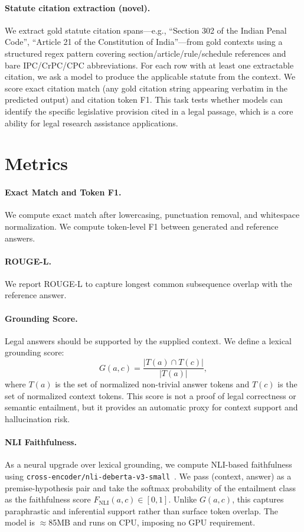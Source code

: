 \documentclass{article}
\begin{document}
\paragraph{Statute citation extraction (novel).}
We extract gold statute citation spans---e.g., ``Section 302 of the Indian Penal Code'', ``Article 21 of the Constitution of India''---from gold contexts using a structured regex pattern covering section/article/rule/schedule references and bare IPC/CrPC/CPC abbreviations. For each row with at least one extractable citation, we ask a model to produce the applicable statute from the context. We score exact citation match (any gold citation string appearing verbatim in the predicted output) and citation token F1. This task tests whether models can identify the specific legislative provision cited in a legal passage, which is a core ability for legal research assistance applications.

\section{Metrics}

\paragraph{Exact Match and Token F1.}
We compute exact match after lowercasing, punctuation removal, and whitespace normalization. We compute token-level F1 between generated and reference answers.

\paragraph{ROUGE-L.}
We report ROUGE-L to capture longest common subsequence overlap with the reference answer.

\paragraph{Grounding Score.}
Legal answers should be supported by the supplied context. We define a lexical grounding score:
\[
G(a,c) = \frac{|T(a) \cap T(c)|}{|T(a)|},
\]
where $T(a)$ is the set of normalized non-trivial answer tokens and $T(c)$ is the set of normalized context tokens. This score is not a proof of legal correctness or semantic entailment, but it provides an automatic proxy for context support and hallucination risk.

\paragraph{NLI Faithfulness.}
As a neural upgrade over lexical grounding, we compute NLI-based faithfulness using \texttt{cross-encoder/nli-deberta-v3-small}~\citep{hederslab2023nli}. We pass (context, answer) as a premise-hypothesis pair and take the softmax probability of the entailment class as the faithfulness score $F_\mathrm{NLI}(a, c) \in [0,1]$. Unlike $G(a,c)$, this captures paraphrastic and inferential support rather than surface token overlap. The model is $\approx$85MB and runs on CPU, imposing no GPU requirement.
\end{document}
